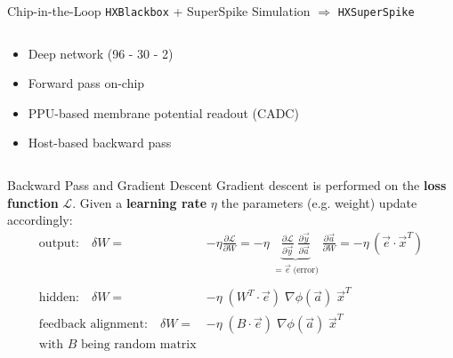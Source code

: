 \documentclass[12pt, aspectratio=169]{beamer}
\begin{document}
\begin{frame}{Chip-in-the-Loop}
	\texttt{HXBlackbox} + SuperSpike Simulation $\Rightarrow$ \texttt{HXSuperSpike}
	\begin{columns}
		\begin{column}{0.45\textwidth}
			\begin{itemize}
				\item Deep network (96 - 30 - 2)  
				\item Forward pass on-chip
				\item PPU-based membrane potential readout (CADC)
				\item Host-based backward pass
			\end{itemize}
		\end{column}
		\begin{column}{0.55\textwidth}
			\begin{figure}
				\scalebox{0.5}{}
			\end{figure}
		\end{column}
	\end{columns}
\end{frame}



\begin{frame}{Backward Pass and Gradient Descent}
Gradient descent is performed on the \textbf{loss function} $\mathcal{L}$. Given a \textbf{learning rate} $\eta$ the parameters (e.g. weight) update accordingly:\\
\begin{align*}
   \text{output:} \quad \delta W =& - \eta \frac{\partial \mathcal{L}}{\partial W} 
            = - \eta \;
            \underbrace{\frac{\partial\mathcal{L}}{\partial \vec{y}} \;
                        \frac{\partial \vec{y}}{\partial \vec{a} }}_{=\vec{e}\; \text{(error)}} \;
              \frac{\partial \vec{a}}{\partial W}
            = - \eta \, (\vec{e} \cdot \vec{x}^T)\\
            \\ 
   \text{hidden:} \quad \delta W =& - \eta \;
                                (W^T \cdot \vec{e}) \;
                                \nabla \phi(\vec{a}) \;
                                \vec{x}^T\\
   \text{feedback alignment:} \quad \delta W =& - \eta \;
                                (B \cdot \vec{e}) \;
                                \nabla \phi(\vec{a}) \;
                                \vec{x}^T\;\\
    \text{with } B \text{ being random matrix}
\end{align*}
\end{frame}
\end{document}
